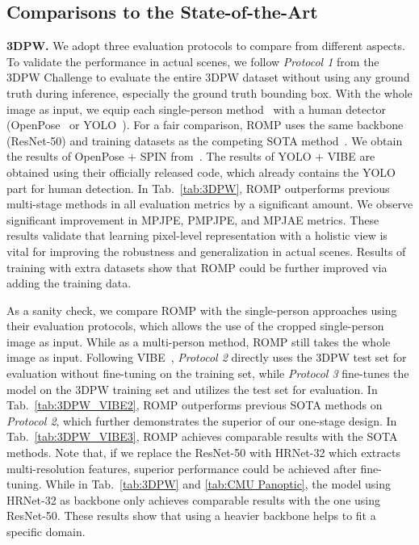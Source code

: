 \documentclass[10pt,twocolumn,letterpaper]{article}
\begin{document}
\vspace{-1mm}
\subsection{Comparisons to the State-of-the-Art~\label{sec:comparisons}}
\vspace{-1mm}
\textbf{3DPW.} 
We adopt three evaluation protocols to compare from different aspects.
To validate the performance in actual scenes, we follow \textit{Protocol 1} from the 3DPW Challenge to evaluate the entire 3DPW dataset without using any ground truth during inference, especially the ground truth bounding box. 
With the whole image as input, we equip each single-person method~\cite{kocabas2020vibe,kolotouros2019spin} with a human detector (OpenPose~\cite{openpose} or YOLO~\cite{redmon2018yolov3}).
For a fair comparison, ROMP uses the same backbone (ResNet-50) and training datasets as the competing SOTA method~\cite{kolotouros2019spin}.
We obtain the results of  OpenPose + SPIN from~\cite{imry2020challengespin}. 
The results of  YOLO + VIBE are obtained using their officially released code, which already contains the YOLO part for human detection.
In Tab.~\ref{tab:3DPW}, ROMP outperforms previous multi-stage methods in all evaluation metrics by a significant amount.
We observe significant improvement in MPJPE, PMPJPE, and MPJAE metrics.
These results validate that learning pixel-level representation with a holistic view is vital for improving the robustness and generalization in actual scenes.
Results of training with extra datasets show that ROMP could be further improved via adding the training data. 

As a sanity check, we compare ROMP with the single-person approaches using their evaluation protocols, which allows the use of the cropped single-person image as input.
While as a multi-person method, ROMP still takes the whole image as input.
Following VIBE~\cite{kocabas2020vibe}, \textit{Protocol 2} directly uses the 3DPW test set for evaluation without fine-tuning on the training set, while \textit{Protocol 3} fine-tunes the model on the 3DPW training set and utilizes the test set for evaluation.
In Tab.~\ref{tab:3DPW_VIBE2}, ROMP outperforms previous SOTA methods on \textit{Protocol 2}, which further demonstrates the superior of our one-stage design.
In  Tab.~\ref{tab:3DPW_VIBE3}, ROMP achieves comparable results with the SOTA methods. 
Note that, if we replace the ResNet-50 with HRNet-32 which extracts multi-resolution features, superior performance could be achieved after fine-tuning. While in Tab.~\ref{tab:3DPW} and \ref{tab:CMU Panoptic}, the model using HRNet-32 as backbone only achieves comparable results with the one using ResNet-50. 
These results show that using a heavier backbone helps to fit a specific domain.
\end{document}
